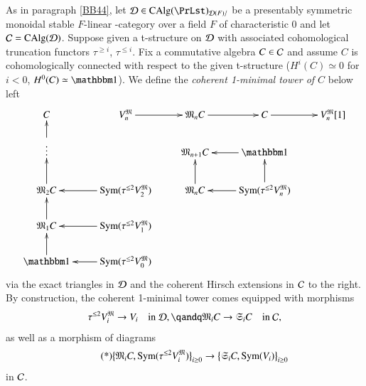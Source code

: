 \label{DB34}
As in paragraph \ref{BB44}, let $\Dd \in \CAlg (\PrLst)_{\Dd(F)/}$ be a presentably symmetric monoidal stable $F$-linear \oo-category over a field $F$ of characteristic 0 and let $\mathcal{C} = \operatorname{CAlg}(\mathcal{D})$. Suppose given a t-structure on $\mathcal{D}$ with associated cohomological truncation functors $\tau^{\ge i}$, $\tau^{\le i}$. Fix a commutative algebra $C \in \mathcal{C}$ and assume $C$ is cohomologically connected with respect to the given t-structure ($H^i(C) \simeq 0$ for $i <0$, $H^0(C) \simeq \one$). We define the \emph{coherent 1-minimal tower of $C$} below left 
\[
\xymatrix
@ R = 4ex
{
C 
& V^\fkM_n \ar[r] & \fkM_n C \ar[r] & C \ar[r] & V^\fkM_n[1]
\\
\vdots \ar[u] && \fkM_{n+1}C  & \one \ar[l] 
\\ 
\fkM_2 C \ar[u] & \Sym ( \tau^{\le 2} V^\fkM_2) 
\ar[l] & 
\fkM_n C \ar[u] & 
\Sym (\tau^{\le 2}V^\fkM_n) 
\ar[l] \ar[u].
\\
\fkM_1 C \ar[u] & 
\Sym (\tau^{\le 2}V^\fkM_1) 
\ar[l] 
\\
\one \ar[u] & 
\Sym (\tau^{\le 2}V^\fkM_0) 
\ar[l]
}
\]
via the exact triangles in $\mathcal{D}$ and the coherent Hirsch extensions in $\mathcal{C}$ to the right. By construction, the coherent 1-minimal tower comes equipped with morphisms
\[
\tau^{\le 2} V_i^\fkM
\to
V_i
\quad \text{in } \Dd,
\qandq
\fkM_i C \to \fkS_i C
\quad \text{in } \Cc,  
\]
as well as a morphism of diagrams
\[
\tag{*}
\big\{\mathfrak{M}_i C, \operatorname{Sym} (\tau^{\le 2} V_i^{\mathfrak{M}}) \big\}_{i \ge 0}
\to
\big\{\mathfrak{S}_i C, \operatorname{Sym} ( V_i) \big\}_{i \ge 0}
\]
in $\mathcal{C}$. 

